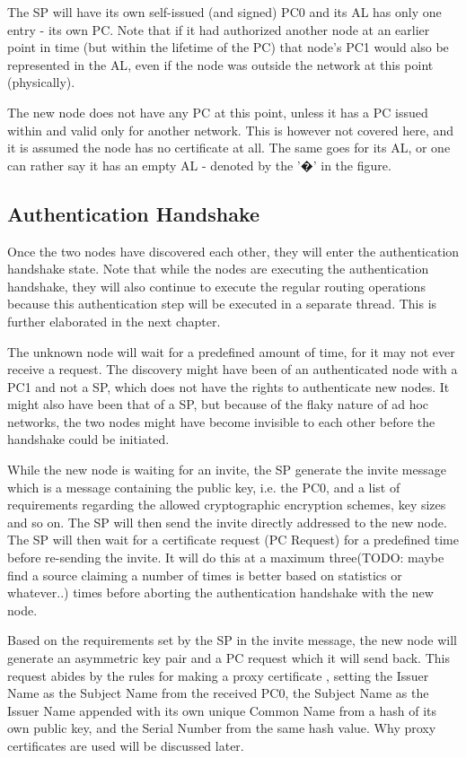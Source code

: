 The \ac{SP} will have its own self-issued (and signed) \ac{PC0} and its \ac{AL}
has only one entry - its own \ac{PC}. Note that if it had authorized another
node at an earlier point in time (but within the lifetime of the \ac{PC}) that
node's \ac{PC1} would also be represented in the \ac{AL}, even if the node was
outside the network at this point (physically).

The new node does not have any \ac{PC} at this point, unless it has a \ac{PC}
issued within and valid only for another network. This is however not covered
here, and it is assumed the node has no certificate at all. The same goes for
its \ac{AL}, or one can rather say it has an empty \ac{AL} - denoted by the '�'
in the figure.

\subsection{Authentication Handshake}
Once the two nodes have discovered each other, they will enter the
authentication handshake state. Note that while the nodes are executing the
authentication handshake, they will also continue to execute the regular routing
operations because this authentication step will be executed in a separate
thread. This is further elaborated in the next chapter.

The unknown node will wait for a predefined amount of time, for it may not ever
receive a request. The discovery might have been of an authenticated node with a
\ac{PC1} and not a \ac{SP}, which does not have the rights to authenticate new
nodes. It might also have been that of a \ac{SP}, but because of the flaky
nature of ad hoc networks, the two nodes might have become invisible to each
other before the handshake could be initiated.

While the new node is waiting for an invite, the \ac{SP} generate the invite
message which is a message containing the public key, i.e. the \ac{PC0}, and a
list of requirements regarding the allowed cryptographic encryption schemes, key
sizes and so on. The \ac{SP} will then send the invite directly addressed to the
new node. The \ac{SP} will then wait for a certificate request (\ac{PC} Request)
for a predefined time before re-sending the invite. It will do this at a maximum
three(TODO: maybe find a source claiming a number of times is better based on
statistics or whatever..) times before aborting the authentication handshake
with the new node.

Based on the requirements set by the \ac{SP} in the invite message, the new node
will generate an asymmetric key pair and a \ac{PC} request which it will send
back. This request abides by the rules for making a proxy certificate
\cite{rfc3820}, setting the Issuer Name as the Subject Name from the received
\ac{PC0}, the Subject Name as the Issuer Name appended with its own unique
Common Name from a hash of its own public key, and the Serial Number from the
same hash value. Why proxy certificates are used will be discussed later.

